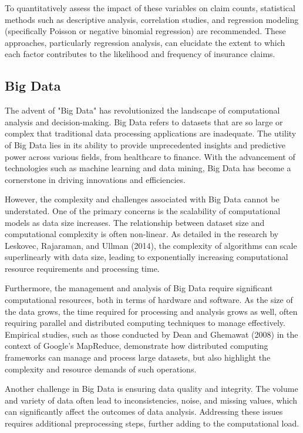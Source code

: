 \documentclass[12pt, twoside,hidelinks]{article}
\theoremstyle{definition}
\numberwithin{equation}{section}
\begin{document}
To quantitatively assess the impact of these variables on claim counts, statistical methods such as descriptive analysis, correlation studies, and regression modeling (specifically Poisson or negative binomial regression) are recommended. These approaches, particularly regression analysis, can elucidate the extent to which each factor contributes to the likelihood and frequency of insurance claims. 



\subsection{Big Data}

The advent of "Big Data" has revolutionized the landscape of computational analysis and decision-making. Big Data refers to datasets that are so large or complex that traditional data processing applications are inadequate. The utility of Big Data lies in its ability to provide unprecedented insights and predictive power across various fields, from healthcare to finance. With the advancement of technologies such as machine learning and data mining, Big Data has become a cornerstone in driving innovations and efficiencies.
\newline

However, the complexity and challenges associated with Big Data cannot be understated. One of the primary concerns is the scalability of computational models as data size increases. The relationship between dataset size and computational complexity is often non-linear. As detailed in the research by Leskovec, Rajaraman, and Ullman (2014), the complexity of algorithms can scale superlinearly with data size, leading to exponentially increasing computational resource requirements and processing time.
\newline

Furthermore, the management and analysis of Big Data require significant computational resources, both in terms of hardware and software. As the size of the data grows, the time required for processing and analysis grows as well, often requiring parallel and distributed computing techniques to manage effectively. Empirical studies, such as those conducted by Dean and Ghemawat (2008) in the context of Google's MapReduce, demonstrate how distributed computing frameworks can manage and process large datasets, but also highlight the complexity and resource demands of such operations.
\newline

Another challenge in Big Data is ensuring data quality and integrity. The volume and variety of data often lead to inconsistencies, noise, and missing values, which can significantly affect the outcomes of data analysis. Addressing these issues requires additional preprocessing steps, further adding to the computational load.
\newline
\end{document}
